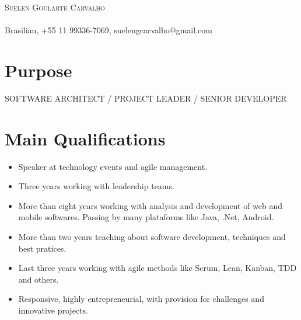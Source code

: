 \documentclass[a4paper, oneside, final]{article}
\begin{document}
\begin{center}
\textsc{\Huge{Suelen Goularte Carvalho}}\\
\ \\
Brasilian, +55 11 99336-7069, suelengcarvalho@gmail.com


\section{Purpose}
	SOFTWARE ARCHITECT / PROJECT LEADER / SENIOR DEVELOPER 



\section{Main Qualifications}

\begin{itemize}
	\item Speaker at technology events and agile management.
	\item Three years working with leadership teams.
	\item More than eight years working with analysis and development of web and mobile softwares. Passing by many plataforms like Java, .Net, Android.
	\item More than two years teaching about software development, techniques and best pratices. 
	\item Last three years working with agile methods like Scrum, Lean, Kanban, TDD and others. 
	\item Responsive, highly entrepreneurial, with provision for challenges and innovative projects.\\
\end{itemize}


\end{center}
\end{document}
